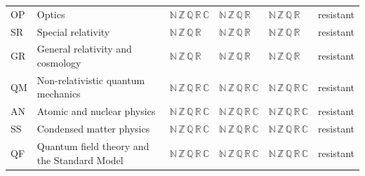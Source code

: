 {\begin{center}
\begin{tabular}{l p{5.2cm} l l l l}
OP & Optics & $\mathbb N\,\mathbb Z\,\mathbb Q\,\mathbb R\,\mathbb C$ & $\mathbb N\,\mathbb Z\,\mathbb Q\,\mathbb R$ & $\mathbb N\,\mathbb Z\,\mathbb Q\,\mathbb R$ & resistant \\
SR & Special relativity & $\mathbb N\,\mathbb Z\,\mathbb Q\,\mathbb R$ & $\mathbb N\,\mathbb Z\,\mathbb Q\,\mathbb R$ & $\mathbb N\,\mathbb Z\,\mathbb Q\,\mathbb R$ & resistant \\
GR & General relativity and cosmology & $\mathbb N\,\mathbb Z\,\mathbb Q\,\mathbb R$ & $\mathbb N\,\mathbb Z\,\mathbb Q\,\mathbb R$ & $\mathbb N\,\mathbb Z\,\mathbb Q\,\mathbb R$ & resistant \\
QM & Non-relativistic quantum mechanics & $\mathbb N\,\mathbb Z\,\mathbb Q\,\mathbb R\,\mathbb C$ & $\mathbb N\,\mathbb Z\,\mathbb Q\,\mathbb R\,\mathbb C$ & $\mathbb N\,\mathbb Z\,\mathbb Q\,\mathbb R\,\mathbb C$ & resistant \\
AN & Atomic and nuclear physics & $\mathbb N\,\mathbb Z\,\mathbb Q\,\mathbb R\,\mathbb C$ & $\mathbb N\,\mathbb Z\,\mathbb Q\,\mathbb R\,\mathbb C$ & $\mathbb N\,\mathbb Z\,\mathbb Q\,\mathbb R\,\mathbb C$ & resistant \\
SS & Condensed matter physics & $\mathbb N\,\mathbb Z\,\mathbb Q\,\mathbb R\,\mathbb C$ & $\mathbb N\,\mathbb Z\,\mathbb Q\,\mathbb R\,\mathbb C$ & $\mathbb N\,\mathbb Z\,\mathbb Q\,\mathbb R\,\mathbb C$ & resistant \\
QF & Quantum field theory and the Standard Model & $\mathbb N\,\mathbb Z\,\mathbb Q\,\mathbb R\,\mathbb C$ & $\mathbb N\,\mathbb Z\,\mathbb Q\,\mathbb R\,\mathbb C$ & $\mathbb N\,\mathbb Z\,\mathbb Q\,\mathbb R\,\mathbb C$ & resistant \\
\bottomrule
\end{tabular}
\end{center}
}
